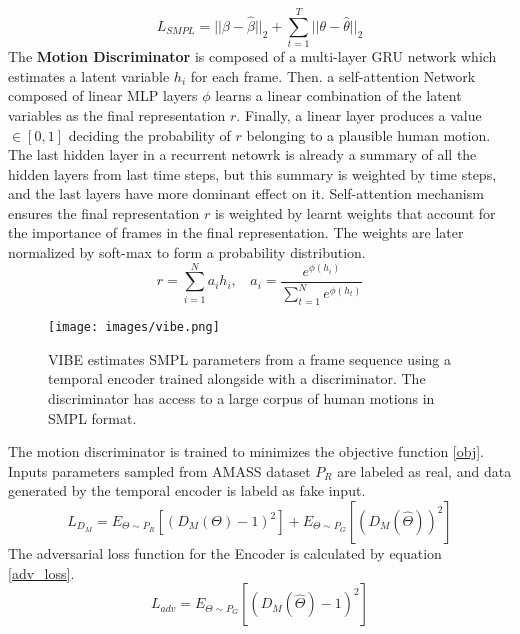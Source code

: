 \documentclass[extendedabs]{bmvc2k}
\begin{document}
\vspace{-1mm}
\begin{equation}
    L_{SMPL} = ||\beta - \hat{\beta}||_2 + \sum_{t=1}^T ||\theta - \hat{\theta}||_2
\end{equation}
The \textbf{Motion Discriminator} is composed of a multi-layer GRU network which estimates a latent variable $h_i$ for each frame. Then. a self-attention Network composed of linear MLP layers $\phi$ learns a linear combination of the latent variables as the final representation $r$. Finally, a linear layer produces a value $\in [0, 1]$ deciding the probability of $r$ belonging to a plausible human motion.\\
The last hidden layer in a recurrent netowrk is already a summary of all the hidden layers from last time steps, but this summary is weighted by time steps, and the last layers have more dominant effect on it. Self-attention mechanism ensures the final representation $r$ is weighted by learnt weights that account for the importance of frames in the final representation. The weights are later normalized by soft-max to form a probability distribution.\\
\begin{equation}
   r = \sum_{i=1}^Na_ih_i,\> \>\>\> a_i = \dfrac{e^{\phi(h_i)}}{\sum_{t=1}^N e^{\phi(h_t)}}  
\end{equation}
\begin{figure}
        \centering
        \texttt{[image: images/vibe.png]}
        \caption{VIBE estimates SMPL parameters from a frame sequence using a temporal encoder trained alongside with a discriminator. The discriminator has access to a large corpus of human motions in SMPL format.}
        \label{vibe_fig}
        \vspace{-4mm}
\end{figure}
The motion discriminator is trained to minimizes the objective function \ref{obj}. Inputs parameters sampled from AMASS dataset $P_R$ are labeled as real, and data generated by the temporal encoder is labeld as fake input.
\begin{equation}
    \label{obj}
    L_{D_M} = E_{\Theta \sim P_{R}}[(D_M(\Theta) - 1)^2] + E_{\Theta \sim P_G}[(D_M(\hat{\Theta}))^2]
\end{equation}
The adversarial loss function for the Encoder is calculated by equation \ref{adv_loss}.
\begin{equation}
L_{adv} = E_{\Theta \sim P_G}[(D_M(\hat{\Theta}) - 1)^2]
\label{adv_loss}
\end{equation}
\end{document}
